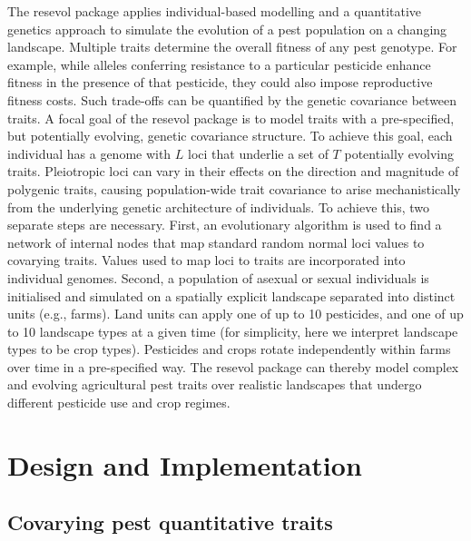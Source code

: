 \documentclass[10pt,letterpaper]{article}
\begin{document}
The resevol package applies individual-based modelling and a quantitative genetics approach to simulate the evolution of a pest population on a changing landscape.
Multiple traits determine the overall fitness of any pest genotype.
For example, while alleles conferring resistance to a particular pesticide enhance fitness in the presence of that pesticide, they could also impose reproductive fitness costs.
Such trade-offs can be quantified by the genetic covariance between traits.
A focal goal of the resevol package is to model traits with a pre-specified, but potentially evolving, genetic covariance structure.
To achieve this goal, each individual has a genome with \(L\) loci that underlie a set of \(T\) potentially evolving traits.
Pleiotropic loci can vary in their effects on the direction and magnitude of polygenic traits, causing population-wide trait covariance to arise mechanistically from the underlying genetic architecture of individuals.
To achieve this, two separate steps are necessary.
First, an evolutionary algorithm is used to find a network of internal nodes that map standard random normal loci values to covarying traits.
Values used to map loci to traits are incorporated into individual genomes.
Second, a population of asexual or sexual individuals is initialised and simulated on a spatially explicit landscape separated into distinct units (e.g., farms).
Land units can apply one of up to 10 pesticides, and one of up to 10 landscape types at a given time (for simplicity, here we interpret landscape types to be crop types).
Pesticides and crops rotate independently within farms over time in a pre-specified way.
The resevol package can thereby model complex and evolving agricultural pest traits over realistic landscapes that undergo different pesticide use and crop regimes.

\hypertarget{design-and-implementation}{%
\section{Design and Implementation}\label{design-and-implementation}}

\hypertarget{mine_gmatrix}{%
\subsection{Covarying pest quantitative traits}\label{mine_gmatrix}}
\end{document}
